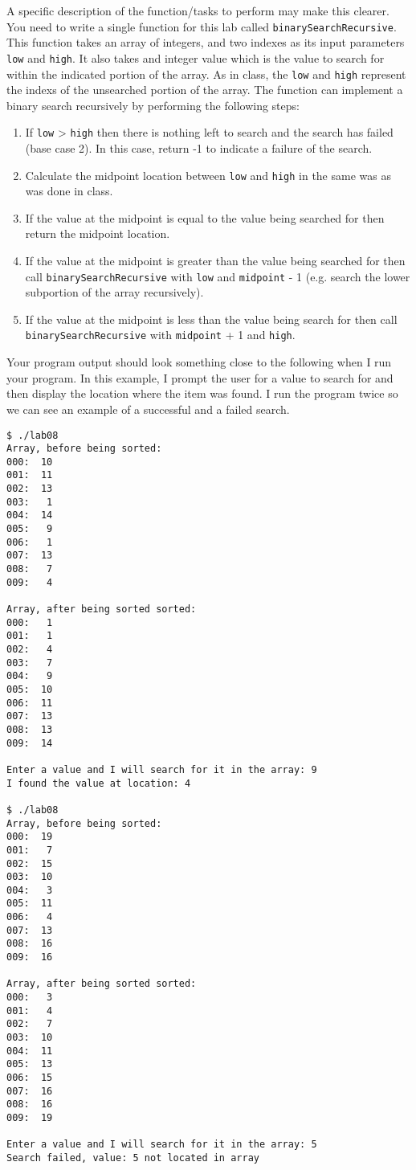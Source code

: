 \documentclass[11pt]{article}
\begin{document}
A specific description of the function/tasks to perform may make this
clearer.  You need to write a single function for this lab called
\verb~binarySearchRecursive~.  This function takes an array of integers,
and two indexes as its input parameters \verb~low~ and \verb~high~.  It also
takes and integer value which is the value to search for within the
indicated portion of the array.  As in class, the \verb~low~ and \verb~high~
represent the indexs of the unsearched portion of the array.  The
function can implement a binary search recursively by performing the
following steps:

\begin{enumerate}
\item If \verb~low~ > \verb~high~ then there is nothing left to search and the
   search has failed (base case 2).  In this case, return -1 to
   indicate a failure of the search.
\item Calculate the midpoint location between \verb~low~ and \verb~high~ in the
   same was as was done in class.
\item If the value at the midpoint is equal to the value being searched for
   then return the midpoint location.
\item If the value at the midpoint is greater than the value being searched for
   then call \verb~binarySearchRecursive~ with \verb~low~ and \verb~midpoint~ - 1 (e.g. 
   search the lower subportion of the array recursively).
\item If the value at the midpoint is less than the value being search for 
   then call \verb~binarySearchRecursive~ with \verb~midpoint~ + 1 and \verb~high~.
\end{enumerate}

Your program output should look something close to the following when
I run your program.  In this example, I prompt the user for a value to
search for and then display the location where the item was found.  I
run the program twice so we can see an example of a successful and a
failed search.


\begin{verbatim}
$ ./lab08
Array, before being sorted:
000:  10
001:  11
002:  13
003:   1
004:  14
005:   9
006:   1
007:  13
008:   7
009:   4

Array, after being sorted sorted:
000:   1
001:   1
002:   4
003:   7
004:   9
005:  10
006:  11
007:  13
008:  13
009:  14

Enter a value and I will search for it in the array: 9
I found the value at location: 4

$ ./lab08
Array, before being sorted:
000:  19
001:   7
002:  15
003:  10
004:   3
005:  11
006:   4
007:  13
008:  16
009:  16

Array, after being sorted sorted:
000:   3
001:   4
002:   7
003:  10
004:  11
005:  13
006:  15
007:  16
008:  16
009:  19

Enter a value and I will search for it in the array: 5
Search failed, value: 5 not located in array
\end{verbatim}
\end{document}
